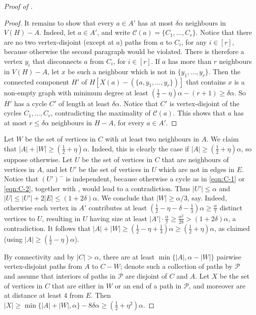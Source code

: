 \documentclass[11pt,english]{article}
\theoremstyle{plain}
\theoremstyle{definition}
\theoremstyle{remark}
\newcommand{\cP}{\mathcal{P}}
\newcommand{\cC}{\mathcal{C}}
\begin{document}
\begin{proof}[Proof of ]
\begin{proof}
				It remains to show that every $a \in A'$ has at most $\delta \alpha$ neighbours in $V(H) - A$.
				Indeed, let $a \in A'$, and write $\cC(a) = \{C_1, \ldots, C_r\}$.
				Notice that there are no two vertex-disjoint (except at $a$) paths from $a$ to $C_i$, for any $i \in [r]$, because otherwise the second paragraph would be violated. There is therefore a vertex $y_i$ that disconnects $a$ from $C_i$, for $i \in [r]$. If $a$ has more than $r$ neighbours in $V(H) - A$, let $x$ be such a neighbour which is not in $\{y_1, \ldots, y_r\}$. Then the connected component $H'$ of $H[X(a) - (\{a, y_1, \ldots, y_r\})]$ that contains $x$ is a non-empty graph with minimum degree at least $(\frac{1}{2} - \eta)\alpha - (r+1) \ge \delta \alpha$. So $H'$ has a cycle $C'$ of length at least $\delta \alpha$. Notice that $C'$ is vertex-disjoint of the cycles $C_1, \ldots, C_r$, contradicting the maximality of $\cC(a)$. This shows that $a$ has at most $r \le \delta \alpha$ neighbours in $H - A$, for every $a \in A'$.
			\end{proof}

			Let $W$ be the set of vertices in $C$ with at least two neighbours in $A$.
			We claim that $|A| + |W| \ge (\frac{1}{2} + \eta)\alpha$.
			Indeed, this is clearly the case if $|A| \ge (\frac{1}{2} + \eta)\alpha$, so suppose otherwise. Let $U$ be the set of vertices in $C$ that are neighbours of vertices in $A$, and let $U'$ be the set of vertices in $U$ which are not in edges in $E$. Notice that $(U')^-$ is independent, because otherwise a cycle as in \eqref{eqn:C-1} or \eqref{eqn:C-2}, together with , would lead to a contradiction. Thus $|U'| \le \alpha$ and $|U| \le |U'| + 2|E| \le (1 + 2\delta)\alpha$. We conclude that $|W| \ge \alpha/3$, say. 
			Indeed, otherwise each vertex in $A'$ contributes at least $(\frac{1}{2} - \eta -\delta - \frac{1}{3})\alpha \ge \frac{\alpha}{7}$ distinct vertices to $U$, resulting in $U$ having size at least $|A'| \cdot \frac{\alpha}{7} \ge  \frac{\alpha^2}{28} > (1 + 2\delta)\alpha$, a contradiction. It follows that $|A| + |W| \ge (\frac{1}{2} - \eta + \frac{1}{3})\alpha \ge (\frac{1}{2} + \eta)\alpha$, as claimed (using $|A| \ge (\frac{1}{2} - \eta)\alpha$).

			By connectivity and by $|C| > \alpha$, there are at least $\min\{|A|, \alpha - |W|\}$ pairwise vertex-disjoint paths from $A$ to $C - W$; denote such a collection of paths by $\cP$ and assume that interiors of paths in $\cP$ are disjoint of $C$ and $A$. Let $X$ be the set of vertices in $C$ that are either in $W$ or an end of a path in $\cP$, and moreover are at distance at least $4$ from $E$. Then $|X| \ge \min\{|A| + |W|, \alpha\} - 8\delta \alpha \ge (\frac{1}{2} + \eta^2)\alpha$. 
			

\end{proof}
\end{document}

